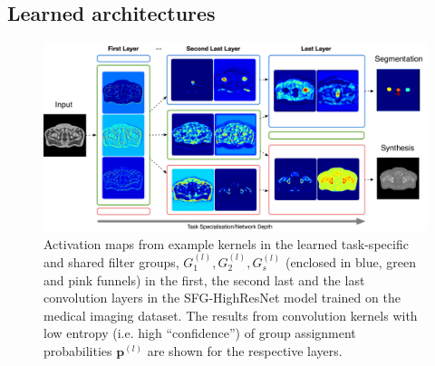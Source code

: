 




\subsection{Learned architectures} \label{sec:learned_architecture}

\begin{figure}[ht]
	\center
	\includegraphics[width=\linewidth]{chapter_6/figures/FINAL.pdf}
	\caption{\small Activation maps from example kernels in the learned task-specific and shared filter groups, $G^{(l)}_{1}, G^{(l)}_{2}, G^{(l)}_{s}$ (enclosed in blue, green and pink funnels) in the first, the second last and the last convolution layers in the SFG-HighResNet model trained on the medical imaging dataset. The results from convolution kernels with low entropy (i.e. high ``confidence'') of group assignment probabilities $\mathbf{p}^{(l)}$  are shown for the respective layers.  }
	\label{fig:activations}
\end{figure}

